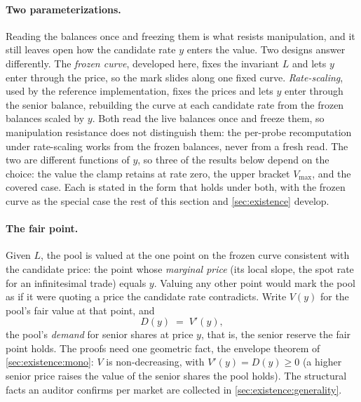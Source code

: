 \paragraph{Two parameterizations.}
Reading the balances once and freezing them is what resists
manipulation, and it still leaves open how the candidate rate $y$ enters
the value. Two designs answer differently. The \emph{frozen curve},
developed here, fixes the invariant $L$ and lets $y$ enter through the
price, so the mark slides along one fixed curve. \emph{Rate-scaling},
used by the reference implementation, fixes the prices and lets $y$
enter through the senior balance, rebuilding the curve at each candidate
rate from the frozen balances scaled by $y$. Both read the live balances
once and freeze them, so manipulation resistance does not distinguish
them: the per-probe recomputation under rate-scaling works from the
frozen balances, never from a fresh read. The two are different
functions of $y$, so three of the results below depend on the choice:
the value the clamp retains at rate zero, the upper bracket $V_{\max}$,
and the covered case. Each is stated in the form that holds under both,
with the frozen curve as the special case the rest of this section
and \cref{sec:existence} develop.

\paragraph{The fair point.}
Given $L$, the pool is valued at the one point on the frozen curve
consistent with the candidate price: the point whose \emph{marginal
price} (its local slope, the spot rate for an infinitesimal trade)
equals $y$. Valuing any other point would mark the pool as if it were
quoting a price the candidate rate contradicts. Write $V(y)$ for the
pool's fair value at that point, and
\[
  D(y) \;=\; V'(y),
\]
the pool's \emph{demand} for senior shares at price $y$, that is, the
senior reserve the fair point holds. The proofs need one geometric
fact, the envelope theorem of \cref{sec:existence:mono}: $V$ is
non-decreasing, with $V'(y) = D(y) \geq 0$ (a higher senior price
raises the value of the senior shares the pool holds). The structural
facts an auditor confirms per market are collected in
\cref{sec:existence:generality}.

